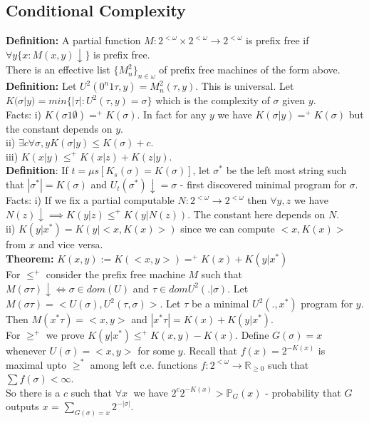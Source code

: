\documentclass{article}
\newcommand{\bb}{\mathbb}
\begin{document}
  \subsection{Conditional Complexity}
  \textbf{Definition:} A partial function $M:2^{<\omega}\times 2^{<\omega} \to 2^{<\omega}$ is prefix free if $\forall y \{x : M(x,y)\downarrow\}$ is prefix free.\\
  There is an effective list $\{M_n^2\}_{n \in \omega}$ of prefix free machines of the form above.\\
  \textbf{Definition:} Let $U^2(0^n1\tau,y) = M^2_n(\tau, y)$. This is universal.
  Let $K(\sigma| y) = min \{|\tau|: U^2(\tau,y) = \sigma\}$ which is the complexity of $\sigma$ given $y$. \\
  Facts: i) $K(\sigma 1 \emptyset) =^+ K(\sigma)$. In fact for any $y$ we have $K(\sigma | y ) =^+ K(\sigma)$ but the constant depends on $y$.\\
  ii) $\exists c \forall \sigma,y K(\sigma|y) \leq K(\sigma)+ c$.\\
  iii) $K(x|y) \leq^+ K(x|z) + K(z|y)$.\\
  \textbf{Definition}: If $t =\mu s [K_s(\sigma) = K(\sigma)]$, let $\sigma^*$ be the left most string such that $|\sigma^*| = K(\sigma)$ and $U_t(\sigma^*) \downarrow = \sigma$ - first discovered minimal program for $\sigma$.\\
  Facts: i) If we fix a partial computable $N:2^{<\omega} \to 2^{<\omega}$ then $\forall y,z $  we have $N(z)\downarrow \implies K(y|z) \leq^+ K(y|N(z))$. The constant here depends on $N$.\\
  ii) $K(y|x^*) = K(y|<x,K(x)>)$ since we can compute $<x,K(x)>$ from $x$ and vice versa.\\
  \textbf{Theorem:} $K(x,y):= K(<x,y>) =^+ K(x) + K(y|x^*)$ \\
  For $\leq^+$ consider the prefix free machine $M$ such that $M(\sigma \tau) \downarrow \iff \sigma \in dom(U)$ and $\tau \in dom U^2(.|\sigma)$. Let $M(\sigma \tau) = < U(\sigma), U^2(\tau,\sigma)>$. Let $\tau$ be a minimal $U^2(.,x^*)$ program for $y$. Then $M(x^*\tau) = <x,y>$ and $|x^*\tau | = K(x) + K(y|x^*)$.\\
  For $\geq^+$ we prove $K(y|x^*) \leq^+ K(x,y) - K(x) $. Define $G(\sigma) = x$ whenever $U(\sigma) = <x,y>$ for some $y$. Recall that $f(x) = 2^{-K(x)}$ is maximal upto $\geq^*$ among left c.e. functions $f: 2^{<\omega} \to \bb R_{\geq0}$ such that $\sum f(\sigma) < \infty$.
  \\ So there is a $c$ such that $\forall x\;$ we have $2^c 2^{-K(x)} > \bb P_G(x)$ - probability that $G$ outputs $x$ = $\sum_{G(\sigma)= x} 2^{-|\sigma|}$.
\end{document}
